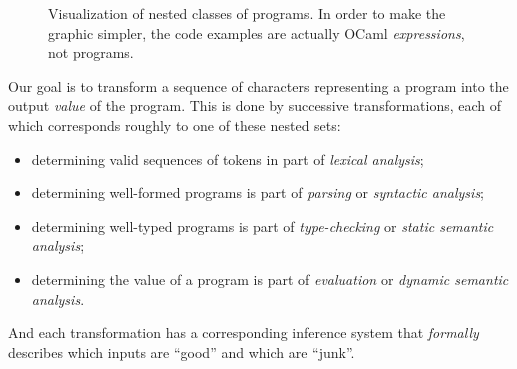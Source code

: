 \begin{figure}
  \centering
  \caption{
    Visualization of nested classes of programs.
    In order to make the graphic simpler, the code examples are actually OCaml \textit{expressions}, not programs.
  }
  \label{fig:nested-progs}
\end{figure}
%
Our goal is to transform a sequence of characters representing a program into the output \textit{value} of the program.
This is done by successive transformations, each of which corresponds roughly to one of these nested sets:
\begin{itemize}
\item determining valid sequences of tokens in part of \textit{lexical analysis};
\item determining well-formed programs is part of \textit{parsing} or \textit{syntactic analysis};
\item determining well-typed programs is part of \textit{type-checking} or \textit{static semantic analysis};
\item determining the value of a program is part of \textit{evaluation} or \textit{dynamic semantic analysis}.
\end{itemize}
And each transformation has a corresponding inference system that \textit{formally} describes which inputs are \enquote{good} and which are \enquote{junk}.

